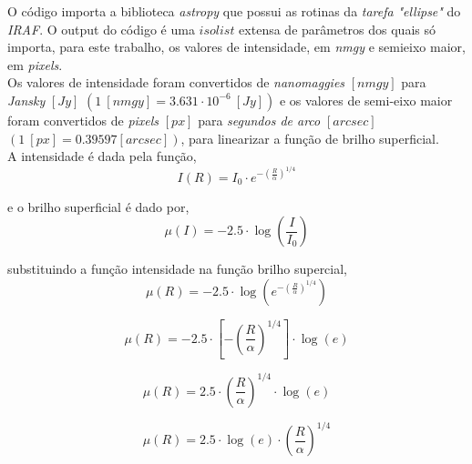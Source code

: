 \documentclass[a4paper, 11pt, fleqn, leqno]{article}
\begin{document}
\noindent O código importa a biblioteca \textit{astropy} que possui as rotinas da \textit{tarefa} \textit{"ellipse"} do \textit{IRAF}. O output do código é uma $isolist$ extensa de parâmetros dos quais só importa, para este trabalho, os valores de intensidade, em \textit{nmgy} e semieixo maior, em \textit{pixels}.\\

\noindent Os valores de intensidade foram convertidos de \textit{nanomaggies} $[nmgy]$ para \textit{Jansky} $[Jy]$ $(1 ~ [nmgy] = 3.631 \cdot 10^{-6} ~ [Jy])$ e os valores de semi-eixo maior foram convertidos de \textit{pixels} $[px]$ para \textit{segundos de arco} $[arcsec]$ $(1 ~ [px] = 0.39597 [arcsec])$, para linearizar a função de brilho superficial.\\

\noindent A intensidade é dada pela função,\\

\begin{equation*}
	I(R) = I_{0} \cdot e^{-\left( \frac{R}{\alpha}\right)^{1/4}}
\end{equation*}

\noindent e o brilho superficial é dado por,\\

\begin{equation*}
	\mu(I) = -2.5 \cdot \log{\left( \frac{I}{I_{0}} \right)}
\end{equation*}

\noindent substituindo a função intensidade na função brilho supercial, \\

\begin{equation*}
	\mu(R) = -2.5 \cdot \log{\left( e^{-\left( \frac{R}{\alpha}\right)^{1/4}} \right) }
\end{equation*}

\begin{equation*}
	\mu(R) = - 2.5 \cdot \left[ -\left( \frac{R}{\alpha}\right)^{1/4} \right] \cdot \log{(e)}
\end{equation*}

\begin{equation*}
	\mu(R) = 2.5 \cdot \left( \frac{R}{\alpha}\right)^{1/4} \cdot \log{(e)}
\end{equation*}

\begin{equation*}
	\mu(R) = 2.5 \cdot \log{(e)} \cdot \left( \frac{R}{\alpha}\right)^{1/4}
\end{equation*}
\end{document}
